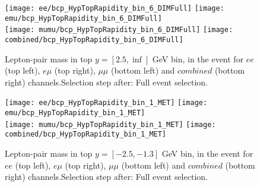 \documentclass[12pt, a4paper, titlepage]{article}
\begin{document}
\clearpage
\newpage
\begin{figure}
  \texttt{[image: ee/bcp\_HypTopRapidity\_bin\_6\_DIMFull]}
  \texttt{[image: emu/bcp\_HypTopRapidity\_bin\_6\_DIMFull]}\\
  \texttt{[image: mumu/bcp\_HypTopRapidity\_bin\_6\_DIMFull]}
  \texttt{[image: combined/bcp\_HypTopRapidity\_bin\_6\_DIMFull]}
\caption{Lepton-pair mass in top $y = [2.5,\inf]$ GeV bin, in the event for $ee$ (top left), $e\mu$ (top right), $\mu\mu$ (bottom left) and $combined$ (bottom right) channels.\newline Selection step after: Full event selection.}
\end{figure}

\clearpage
\newpage







% 
% 

\begin{figure}
  \texttt{[image: ee/bcp\_HypTopRapidity\_bin\_1\_MET]}
  \texttt{[image: emu/bcp\_HypTopRapidity\_bin\_1\_MET]}\\
  \texttt{[image: mumu/bcp\_HypTopRapidity\_bin\_1\_MET]}
  \texttt{[image: combined/bcp\_HypTopRapidity\_bin\_1\_MET]}
\caption{Lepton-pair mass in top $y = [-2.5,-1.3]$ GeV bin, in the event for $ee$ (top left), $e\mu$ (top right), $\mu\mu$ (bottom left) and $combined$ (bottom right) channels.\newline Selection step after: Full event selection.}
\end{figure}
\end{document}
